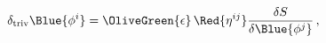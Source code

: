 \begin{equation}
  \delta_{\rm triv} \Blue{\phi^i }=\OliveGreen{\epsilon }\,\Red{\eta ^{ij}}\frac{\delta S}{\delta \Blue{\phi
  ^j}}\,,
 \label{DelTriv}
\end{equation}


